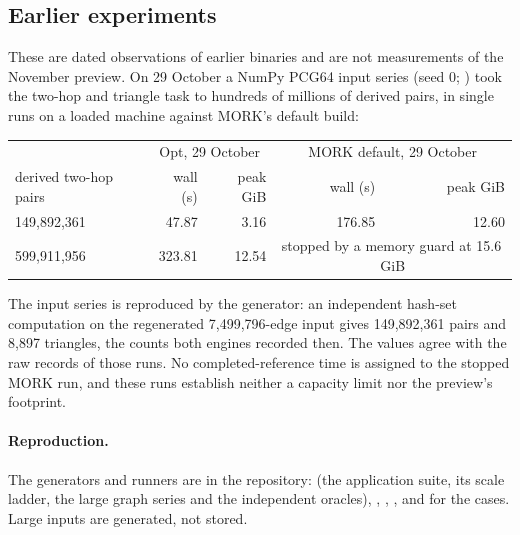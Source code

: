 \subsection{Earlier experiments}
\label{app:runtimes-earlier}

These are dated observations of earlier binaries and are not measurements of
the November preview.  On 29 October a NumPy PCG64 input series (seed 0;
) took the two-hop and
triangle task to hundreds of millions of derived pairs, in single runs on a
loaded machine against MORK's default build:

\begin{center}
\small
\begin{tabular}{@{}lrrrr@{}}
\toprule
 & \multicolumn{2}{c}{Opt, 29 October} & \multicolumn{2}{c}{MORK default, 29 October} \\
derived two-hop pairs & wall (s) & peak GiB & wall (s) & peak GiB \\
\midrule
149,892,361 & 47.87 & 3.16 & 176.85 & 12.60 \\
599,911,956 & 323.81 & 12.54 & \multicolumn{2}{c}{stopped by a memory guard at 15.6\,GiB} \\
\bottomrule
\end{tabular}
\end{center}

\noindent The input series is reproduced by the generator: an independent hash-set
computation on the regenerated 7,499,796-edge input gives 149,892,361 pairs and
8,897 triangles, the counts both engines recorded then.
The values agree with the raw records of those runs.  No completed-reference
time is assigned to the stopped MORK run, and these runs establish neither a
capacity limit nor the preview's footprint.

\paragraph{Reproduction.}  The generators and runners are in the \CeTTa{}
repository:  (the application suite, its scale
ladder, the large graph series and the independent oracles),
, ,
, and  for the \HE{}
cases.  Large inputs are generated, not stored.

